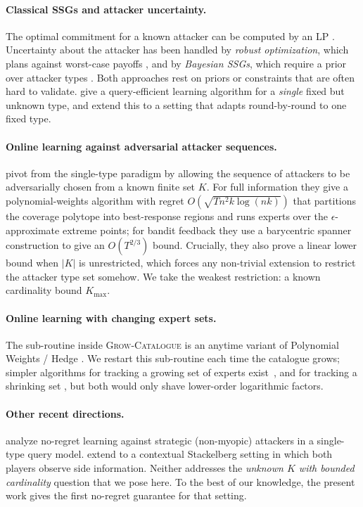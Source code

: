 \documentclass[letterpaper,9pt,twocolumn]{extarticle}
\newcommand{\Kmax}{K_{\max}}
\theoremstyle{plain}
\theoremstyle{definition}
\theoremstyle{remark}
\begin{document}
\paragraph{Classical SSGs and attacker uncertainty.}
The optimal commitment for a known attacker can be computed by an LP
\citep{conitzer2006}. Uncertainty about the attacker has been handled by
\emph{robust optimization}, which plans against worst-case payoffs
\citep{pita2010}, and by \emph{Bayesian SSGs}, which require a prior over
attacker types \citep{kiekintveld2011,marecki2012}. Both approaches rest on
priors or constraints that are often hard to validate. \citet{letchford2009}
give a query-efficient learning algorithm for a \emph{single} fixed but
unknown type, and \citet{blum2014b} extend this to a setting that adapts
round-by-round to one fixed type.

\paragraph{Online learning against adversarial attacker sequences.}
\citet{balcan2015} pivot from the single-type paradigm by allowing the
sequence of attackers to be adversarially chosen from a known finite set
$K$. For full information they give a polynomial-weights algorithm with
regret $O(\sqrt{Tn^2 k\log(nk)})$ that partitions the coverage polytope
into best-response regions and runs experts over the
$\epsilon$-approximate extreme points; for bandit feedback they use a
barycentric spanner construction to give an $O(T^{2/3})$ bound.
Crucially, they also prove a linear lower bound when $|K|$ is unrestricted,
which forces any non-trivial extension to restrict the attacker type set
somehow. We take the weakest restriction: a known cardinality bound
$\Kmax$.

\paragraph{Online learning with changing expert sets.}
The sub-routine inside \textsc{Grow-Catalogue} is an anytime variant of
Polynomial Weights / Hedge \citep{littlestone1994,freund1997,cesa2006}. We
restart this sub-routine each time the catalogue grows; simpler algorithms
for tracking a growing set of experts exist~\citep{mourtada2017}, and for
tracking a shrinking set \citep{gaillard2019}, but both would only shave
lower-order logarithmic factors.

\paragraph{Other recent directions.}
\citet{haghtalab2022} analyze no-regret learning against strategic
(non-myopic) attackers in a single-type query model. \citet{harris2024side}
extend to a contextual Stackelberg setting in which both players observe
side information. Neither addresses the \emph{unknown $K$ with bounded
cardinality} question that we pose here. To the best of our knowledge, the
present work gives the first no-regret guarantee for that setting.
\end{document}
